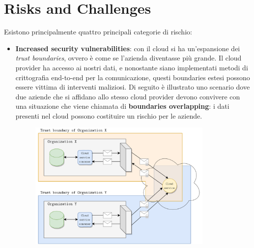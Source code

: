 \section{Risks and Challenges}
Esistono principalmente quattro principali categorie di rischio:
\begin{itemize}
    \item \textbf{Increased security vulnerabilities}: con il cloud si ha un'espansione dei \textit{trust boundaries}, ovvero è come se l'azienda diventasse più grande. Il cloud provider ha accesso ai nostri dati, e nonostante siano implementati metodi di crittografia end-to-end per la comunicazione, questi boundaries estesi possono essere vittima di interventi maliziosi. Di seguito è illustrato uno scenario dove due aziende che si affidano allo stesso cloud provider devono convivere con una situazione che viene chiamata di \textbf{boundaries overlapping}: i dati presenti nel cloud possono costituire un rischio per le aziende.
    
    \begin{figure}[ht]
    \centering
    \includegraphics[width=9cm]{./Images/cap2/2.6.png}
    \label{fig:image2.6}
\end{figure}
    

\end{itemize}
